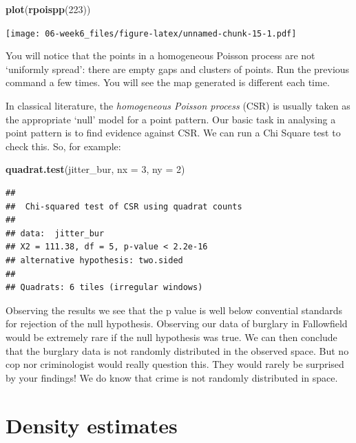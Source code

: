 \documentclass[]{book}
\newenvironment{Shaded}{\begin{snugshade}}{\end{snugshade}}
\newcommand{\DataTypeTok}[1]{\textcolor[rgb]{0.13,0.29,0.53}{#1}}
\newcommand{\DecValTok}[1]{\textcolor[rgb]{0.00,0.00,0.81}{#1}}
\newcommand{\KeywordTok}[1]{\textcolor[rgb]{0.13,0.29,0.53}{\textbf{#1}}}
\newcommand{\NormalTok}[1]{#1}
\begin{document}
\begin{Shaded}
\begin{Highlighting}[]
\KeywordTok{plot}\NormalTok{(}\KeywordTok{rpoispp}\NormalTok{(}\DecValTok{223}\NormalTok{))}
\end{Highlighting}
\end{Shaded}

\texttt{[image: 06-week6\_files/figure-latex/unnamed-chunk-15-1.pdf]}

You will notice that the points in a homogeneous Poisson process are not `uniformly spread': there are empty gaps and clusters of points. Run the previous command a few times. You will see the map generated is different each time.

In classical literature, the \emph{homogeneous Poisson process} (CSR) is usually taken as the appropriate `null' model for a point pattern. Our basic task in analysing a point pattern is to find evidence against CSR. We can run a Chi Square test to check this. So, for example:

\begin{Shaded}
\begin{Highlighting}[]
\KeywordTok{quadrat.test}\NormalTok{(jitter_bur, }\DataTypeTok{nx =} \DecValTok{3}\NormalTok{, }\DataTypeTok{ny =} \DecValTok{2}\NormalTok{)}
\end{Highlighting}
\end{Shaded}

\begin{verbatim}
## 
##  Chi-squared test of CSR using quadrat counts
## 
## data:  jitter_bur
## X2 = 111.38, df = 5, p-value < 2.2e-16
## alternative hypothesis: two.sided
## 
## Quadrats: 6 tiles (irregular windows)
\end{verbatim}

Observing the results we see that the p value is well below convential standards for rejection of the null hypothesis. Observing our data of burglary in Fallowfield would be extremely rare if the null hypothesis was true. We can then conclude that the burglary data is not randomly distributed in the observed space. But no cop nor criminologist would really question this. They would rarely be surprised by your findings! We do know that crime is not randomly distributed in space.

\hypertarget{density-estimates}{%
\section{Density estimates}\label{density-estimates}}
\end{document}
